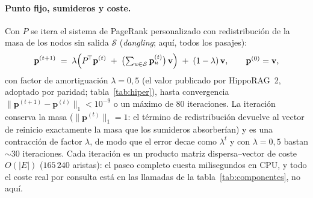 \documentclass[11pt,a4paper]{article}
\newcommand{\hippo}{HippoRAG~2}
\newcommand{\norm}[1]{\lVert #1 \rVert}
\begin{document}
\paragraph{Punto fijo, sumideros y coste.}
Con $P$ se itera el sistema de PageRank personalizado con redistribución
de la masa de los nodos sin salida $\mathcal{S}$ (\emph{dangling}; aquí,
todos los pasajes):
\begin{equation}
\mathbf{p}^{(t+1)} \;=\;
\lambda\Bigl(P^{\!\top}\mathbf{p}^{(t)}
 \;+\; \bigl(\textstyle\sum_{u\in\mathcal{S}} \mathbf{p}^{(t)}_u\bigr)\,\mathbf{v}\Bigr)
\;+\; (1-\lambda)\,\mathbf{v},
\qquad \mathbf{p}^{(0)}=\mathbf{v},
\label{eq:ppr}
\end{equation}
con factor de amortiguación $\lambda = 0{,}5$ (el valor publicado por
\hippo{}, adoptado por paridad; tabla~\ref{tab:hiper}), hasta convergencia
$\norm{\mathbf{p}^{(t+1)}-\mathbf{p}^{(t)}}_1 < 10^{-9}$ o un máximo de
$80$ iteraciones. La iteración conserva la masa
($\norm{\mathbf{p}^{(t)}}_1 = 1$: el término de redistribución devuelve al
vector de reinicio exactamente la masa que los sumideros absorberían) y es
una contracción de factor $\lambda$, de modo que el error decae como
$\lambda^{t}$ y con $\lambda=0{,}5$ bastan $\sim\!30$ iteraciones. Cada
iteración es un producto matriz dispersa--vector de coste $O(|E|)$
($165\,240$ aristas): el paseo completo cuesta milisegundos en CPU, y todo
el coste real por consulta está en las llamadas de la
tabla~\ref{tab:componentes}, no aquí.
\end{document}
